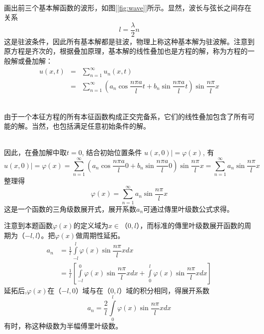 ~~\\ 
画出前三个基本解函数的波形，如图[\ref{fig:wave}]所示。显然，波长与弦长之间存在关系
\[ l = \frac{\lambda}{2} n\]
这是驻波条件，因此所有基本解都是驻波，物理上称这种基本解为驻波解。注意到原方程是齐次的，根据叠加原理，基本解的线性叠加也是方程的解，称为方程的一般解或叠加解：
$$ \begin{array}{llll}
			u(x,t) &=&\sum\limits_{n=1}^{\infty } u_n(x,t)\\
			&=& \sum\limits_{n=1}^{\infty }  (a_n\cos\dfrac{ n\pi a}{l}t+ b_n\sin \dfrac{ n\pi a}{l}t) \sin \dfrac{ n\pi }{l}x
		\end{array}   $$ 
~~\\ 
\begin{hint}
由于一个本征方程的所有本征函数构成正交完备系，它们的线性叠加包含了所有可能的解。当然，也包括满足任意初始条件的解。
\end{hint}

~~\\
因此，在叠加解中取$t=0$, 结合初始位置条件 $u(x,0)|= \varphi (x)$, 有
$$u(x,0)|= \varphi (x) =\sum\limits_{n=1}^{\infty }  (a_n\cos\dfrac{ n\pi a}{l}0+ b_n\sin \dfrac{ n\pi a}{l}0) \sin \dfrac{ n\pi }{l}x = \sum_{n=1}^{\infty } a_n \sin \dfrac{ n\pi }{l}x $$ 
整理得
$$\varphi (x) = \sum_{n=1}^{\infty } a_n \sin \dfrac{ n\pi }{l}x $$ 
这是一个函数的三角级数展开式，展开系数$a_n$可通过傳里叶级数公式求得。

注意到本题函数$\varphi(x)$的定义域为$x \in$（$0,l$），而标准的傳里叶级数展开函数的周期为（$-l,l$）。把$\varphi(x)$做周期性延拓。
$$ \begin{aligned}
	a_n &= \frac{1}{l}\int\limits_{-l }^{l}  \varphi (x) \sin \dfrac{ n\pi }{l}x dx \\
	&= \frac{1}{l}\left[\int\limits_{-l }^{0}  \varphi (x) \sin \dfrac{ n\pi }{l}x dx+ \int\limits_{0 }^{l}  \varphi (x) \sin \dfrac{ n\pi }{l}x dx \right]  
\end{aligned}$$
延拓后,$\varphi(x)$在（$-l,0$）域与在（$0,l$）域的积分相同，得展开系数
\[a_n =  \frac{2}{l}\int\limits_{0 }^{l}  \varphi (x) \sin \dfrac{ n\pi }{l}x dx  \]
有时，称这种级数为半幅傅里叶级数。

